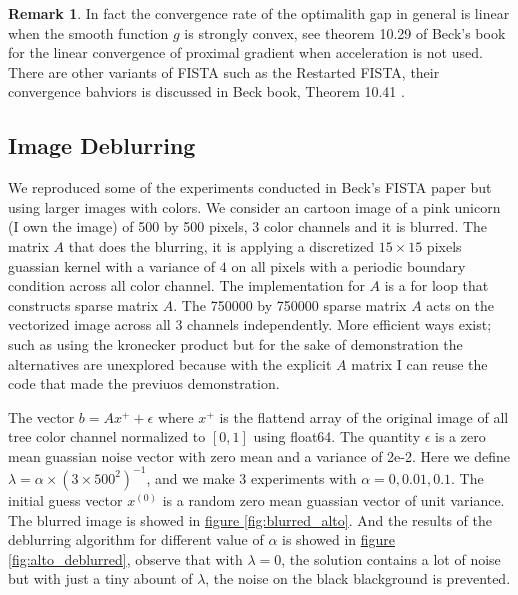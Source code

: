 \documentclass[]{article}
\theoremstyle{definition}
\newtheorem{remark}{Remark}[subsection]
{
    \newtheorem{assumption}{Assumption}
}
\begin{document}
        \begin{remark}
            In fact the convergence rate of the optimalith gap in general is linear when the smooth function $g$ is strongly convex, see theorem 10.29 of Beck's book\cite{book:first_order_opt} for the linear convergence of proximal gradient when acceleration is not used. There are other variants of FISTA such as the Restarted FISTA, their convergence bahviors is discussed in Beck book, Theorem 10.41 \cite{book:first_order_opt}.     
        \end{remark}
        
        
    \subsection*{Image Deblurring}
        We reproduced some of the experiments conducted in Beck's FISTA paper \cite{paper:FISTA} but using larger images with colors. We consider an cartoon image of a pink unicorn (I own the image) of 500 by 500 pixels, 3 color channels and it is blurred. The matrix $A$ that does the blurring, it is applying a discretized $15\times 15$ pixels guassian kernel with a variance of $4$ on all pixels with a periodic boundary condition across all color channel. The implementation for $A$ is a for loop that constructs sparse matrix $A$. The 750000 by 750000 sparse matrix $A$ acts on the vectorized image across all 3 channels independently. More efficient ways exist; such as using the kronecker product but for the sake of demonstration the alternatives are unexplored because with the explicit $A$ matrix I can reuse the code that made the previuos demonstration. 
        \par
        The vector $b = Ax^+ + \epsilon$ where $x^+$ is the flattend array of the original image of all tree color channel normalized to $[0, 1]$ using float64. The quantity $\epsilon$ is a zero mean guassian noise vector with zero mean and a variance of 2e-2. Here we define $\lambda = \alpha\times (3\times500^2)^{-1}$, and we make 3 experiments with $\alpha = 0, 0.01, 0.1$. The initial guess vector $x^{(0)}$ is a random zero mean guassian vector of unit variance. The blurred image is showed in \hyperref[fig:blurred_alto]{figure \ref*{fig:blurred_alto}}. And the results of the deblurring algorithm for different value of $\alpha$ is showed in \hyperref[fig:alto_deblurred]{figure \ref*{fig:alto_deblurred}}, observe that with $\lambda = 0$, the solution contains a lot of noise but with just a tiny abount of $\lambda$, the noise on the black blackground is prevented. 
\end{document}
